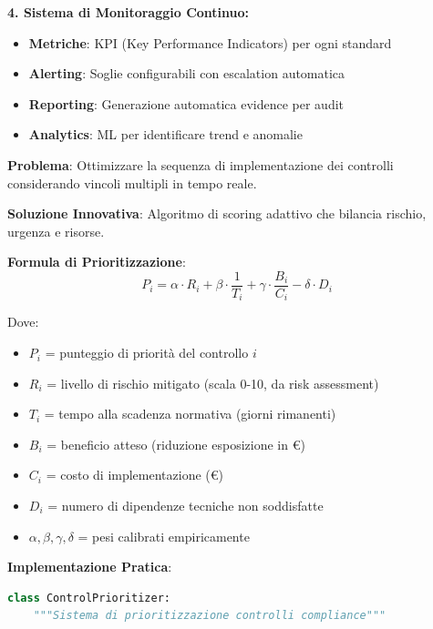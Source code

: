 \textbf{4. Sistema di Monitoraggio Continuo:}
\begin{itemize}
    \item \textbf{Metriche}: KPI (Key Performance Indicators) per ogni standard
    \item \textbf{Alerting}: Soglie configurabili con escalation automatica
    \item \textbf{Reporting}: Generazione automatica evidence per audit
    \item \textbf{Analytics}: ML per identificare trend e anomalie
\end{itemize}

\begin{tcolorbox}[
    colback=blue!5!white,
    colframe=blue!75!black,
    title={\textbf{Innovation Box 4.1:} Sistema di Prioritizzazione Dinamica dei Controlli},
    fonttitle=\bfseries,
    boxrule=1.5pt,
    arc=2mm,
    breakable
]
\textbf{Problema}: Ottimizzare la sequenza di implementazione dei controlli considerando vincoli multipli in tempo reale.

\vspace{0.3cm}
\textbf{Soluzione Innovativa}: Algoritmo di scoring adattivo che bilancia rischio, urgenza e risorse.

\vspace{0.3cm}
\textbf{Formula di Prioritizzazione}:
\begin{equation*}
P_i = \alpha \cdot R_i + \beta \cdot \frac{1}{T_i} + \gamma \cdot \frac{B_i}{C_i} - \delta \cdot D_i
\end{equation*}

Dove:
\begin{itemize}
\item $P_i$ = punteggio di priorità del controllo $i$
\item $R_i$ = livello di rischio mitigato (scala 0-10, da risk assessment)
\item $T_i$ = tempo alla scadenza normativa (giorni rimanenti)
\item $B_i$ = beneficio atteso (riduzione esposizione in €)
\item $C_i$ = costo di implementazione (€)
\item $D_i$ = numero di dipendenze tecniche non soddisfatte
\item $\alpha, \beta, \gamma, \delta$ = pesi calibrati empiricamente
\end{itemize}

\vspace{0.3cm}
\textbf{Implementazione Pratica}:
\begin{lstlisting}[language=Python]
class ControlPrioritizer:
    """Sistema di prioritizzazione controlli compliance"""
    

\end{lstlisting}
\end{tcolorbox}
